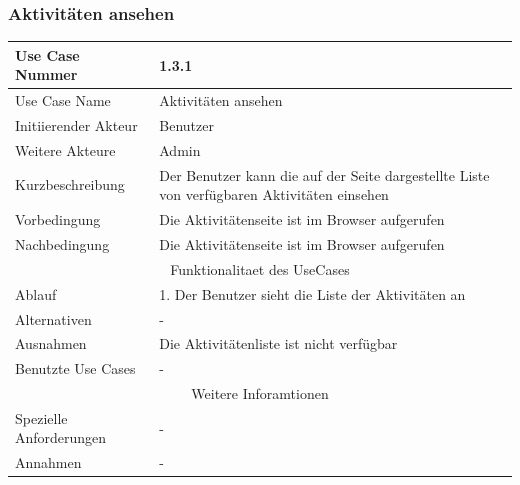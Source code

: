 \documentclass[10pt,a4paper]{article}
\begin{document}
	\subsubsection{Aktivit\"aten ansehen}
	\begin{tabular}{|l|p{.5\linewidth}|}
	\hline Use Case Nummer & 1.3.1 \\ 
	\hline Use Case Name & Aktivit\"aten ansehen \\ 
	\hline Initiierender Akteur & Benutzer \\
	\hline Weitere Akteure & Admin \\
	\hline Kurzbeschreibung & Der Benutzer kann die auf der Seite dargestellte Liste von verf\"ugbaren Aktivit\"aten einsehen \\
	\hline Vorbedingung & Die Aktivit\"atenseite ist im Browser aufgerufen \\
	\hline Nachbedingung & Die Aktivit\"atenseite ist im Browser aufgerufen \\
	\hline \multicolumn{2}{|c|}{Funktionalitaet des UseCases}\\
	\hline Ablauf & 1. Der Benutzer sieht die Liste der Aktivit\"aten an \\
	\hline Alternativen & - \\
	\hline Ausnahmen & Die Aktivit\"atenliste ist nicht verf\"ugbar \\
	\hline Benutzte Use Cases & - \\
	\hline \multicolumn{2}{|c|}{Weitere Inforamtionen} \\
	\hline Spezielle Anforderungen & - \\
	\hline Annahmen & - \\
	\hline
	\end{tabular} 
	
\end{document}
